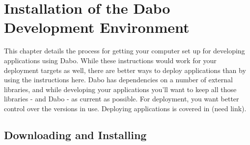 
\chapter{Installation of the Dabo Development Environment}

This chapter details the process for getting your computer set up for developing 
applications using Dabo. While these instructions would work for your deployment 
targets as well, there are better ways to deploy applications than by using the 
instructions here. Dabo has dependencies on a number of external libraries, and 
while developing your applications you'll want to keep all those libraries - and Dabo 
- as current as possible. For deployment, you want better control over the versions 
in use. Deploying applications is covered in (need link).

\section{Downloading and Installing}

